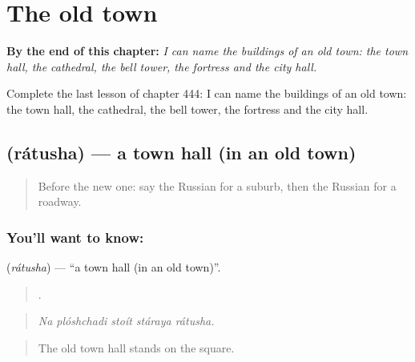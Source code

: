 
\chapter{The old town}
\label{ch:ru-the-old-town}

\begin{chapteropening}
\textbf{By the end of this chapter:} \emph{I can name the buildings of an old town: the town hall, the cathedral, the bell tower, the fortress and the city hall.}

Complete the last lesson of chapter 444: I can name the buildings of an old town: the town hall, the cathedral, the bell tower, the fortress and the city hall.
\end{chapteropening}

\section[\texorpdfstring{\ru{ратуша} (rátusha)}{ратуша (rátusha)}]{ (rátusha) — a town hall (in an old town)}

\label{lesson:RU-C444-ratusha}



\begin{quote}
Before the new one: say the Russian for a suburb, then the Russian for a roadway.
\end{quote}

\subsection*{You'll want to know: }
\textbf{} (\emph{rátusha}) — \textquotedblleft{}a town hall (in an old town)\textquotedblright{}.

\begin{quote}
    .
\end{quote}

\begin{quote}
\emph{Na plóshchadi stoít stáraya rátusha.}
\end{quote}

\begin{quote}
The old town hall stands on the square.
\end{quote}

